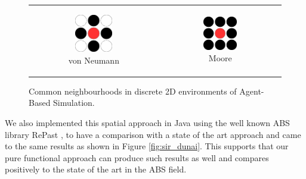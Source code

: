 \begin{figure}
\begin{center}
	\begin{tabular}{c c}
		\begin{subfigure}[b]{0.3\textwidth}
			\centering
			\includegraphics[width=0.5\textwidth, angle=0]{./fig/timedriven/neumann.png}
			\caption{von Neumann}
			\label{fig:neumann_neighbourhood}
		\end{subfigure}
    	&
		\begin{subfigure}[b]{0.3\textwidth}
			\centering
			\includegraphics[width=0.5\textwidth, angle=0]{./fig/timedriven/moore.png}
			\caption{Moore}
			\label{fig:moore_neighbourhood}
		\end{subfigure}
    \end{tabular}
	\caption{Common neighbourhoods in discrete 2D environments of Agent-Based Simulation.}
	\label{fig:abs_neighbourhoods}
\end{center}
\end{figure}

We also implemented this spatial approach in Java using the well known ABS library RePast \cite{north_complex_2013}, to have a comparison with a state of the art approach and came to the same results as shown in Figure \ref{fig:sir_dunai}. This supports that our pure functional approach can produce such results as well and compares positively to the state of the art in the ABS field.


